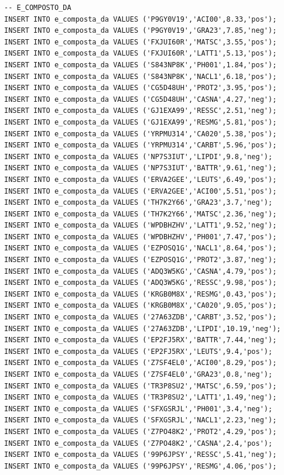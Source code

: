 \documentclass[12pt]{report}
\begin{document}
\begin{scriptsize}
\begin{verbatim}
-- E_COMPOSTO_DA
INSERT INTO e_composta_da VALUES ('P9GY0V19','ACI00',8.33,'pos');
INSERT INTO e_composta_da VALUES ('P9GY0V19','GRA23',7.85,'neg');
INSERT INTO e_composta_da VALUES ('FXJUI60R','MATSC',3.55,'pos');
INSERT INTO e_composta_da VALUES ('FXJUI60R','LATT1',5.13,'pos');
INSERT INTO e_composta_da VALUES ('S843NP8K','PH001',1.84,'pos');
INSERT INTO e_composta_da VALUES ('S843NP8K','NACL1',6.18,'pos');
INSERT INTO e_composta_da VALUES ('CG5D48UH','PROT2',3.95,'pos');
INSERT INTO e_composta_da VALUES ('CG5D48UH','CASNA',4.27,'neg');
INSERT INTO e_composta_da VALUES ('GJ1EXA99','RESSC',2.51,'neg');
INSERT INTO e_composta_da VALUES ('GJ1EXA99','RESMG',5.81,'pos');
INSERT INTO e_composta_da VALUES ('YRPMU314','CA020',5.38,'pos');
INSERT INTO e_composta_da VALUES ('YRPMU314','CARBT',5.96,'pos');
INSERT INTO e_composta_da VALUES ('NP7S3IUT','LIPDI',9.8,'neg');
INSERT INTO e_composta_da VALUES ('NP7S3IUT','BATTR',9.61,'neg');
INSERT INTO e_composta_da VALUES ('ERVA2GEE','LEUTS',6.49,'pos');
INSERT INTO e_composta_da VALUES ('ERVA2GEE','ACI00',5.51,'pos');
INSERT INTO e_composta_da VALUES ('TH7K2Y66','GRA23',3.7,'neg');
INSERT INTO e_composta_da VALUES ('TH7K2Y66','MATSC',2.36,'neg');
INSERT INTO e_composta_da VALUES ('WPDBHZHV','LATT1',9.52,'neg');
INSERT INTO e_composta_da VALUES ('WPDBHZHV','PH001',7.47,'pos');
INSERT INTO e_composta_da VALUES ('EZPOSQ1G','NACL1',8.64,'pos');
INSERT INTO e_composta_da VALUES ('EZPOSQ1G','PROT2',3.87,'neg');
INSERT INTO e_composta_da VALUES ('ADQ3W5KG','CASNA',4.79,'pos');
INSERT INTO e_composta_da VALUES ('ADQ3W5KG','RESSC',9.98,'pos');
INSERT INTO e_composta_da VALUES ('KRGB0M8X','RESMG',0.43,'pos');
INSERT INTO e_composta_da VALUES ('KRGB0M8X','CA020',9.05,'pos');
INSERT INTO e_composta_da VALUES ('27A63ZDB','CARBT',3.52,'pos');
INSERT INTO e_composta_da VALUES ('27A63ZDB','LIPDI',10.19,'neg');
INSERT INTO e_composta_da VALUES ('EP2FJ5RX','BATTR',7.44,'neg');
INSERT INTO e_composta_da VALUES ('EP2FJ5RX','LEUTS',9.4,'pos');
INSERT INTO e_composta_da VALUES ('Z7SF4EL0','ACI00',8.29,'pos');
INSERT INTO e_composta_da VALUES ('Z7SF4EL0','GRA23',0.8,'neg');
INSERT INTO e_composta_da VALUES ('TR3P8SU2','MATSC',6.59,'pos');
INSERT INTO e_composta_da VALUES ('TR3P8SU2','LATT1',1.49,'neg');
INSERT INTO e_composta_da VALUES ('SFXGSRJL','PH001',3.4,'neg');
INSERT INTO e_composta_da VALUES ('SFXGSRJL','NACL1',2.23,'neg');
INSERT INTO e_composta_da VALUES ('Z7PO48K2','PROT2',4.29,'pos');
INSERT INTO e_composta_da VALUES ('Z7PO48K2','CASNA',2.4,'pos');
INSERT INTO e_composta_da VALUES ('99P6JPSY','RESSC',5.41,'neg');
INSERT INTO e_composta_da VALUES ('99P6JPSY','RESMG',4.06,'pos');

\end{verbatim}
\end{scriptsize}
\end{document}
